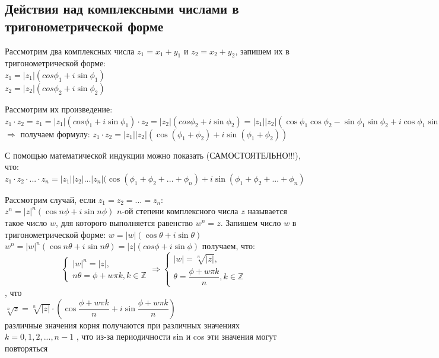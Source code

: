 \documentclass[oneside]{book}
\begin{document}
\begin{enumerate}
\begin{itemize}
\begin{enumerate}
\subsection{Действия над комплексными числами в тригонометрической форме}
\par Рассмотрим два комплексных числа $z_1=x_1+y_1$ и $z_2=x_2+y_2$, запишем их в тригонометрической форме:\\ $z_1=|z_1|(cos\phi_1+i\sin\phi_1)$\\
$z_2=|z_2|(cos\phi_2+i\sin\phi_2)$\\
\par Рассмотрим их произведение:\\ $z_1\cdot z_2=z_1=|z_1|(cos\phi_1+i\sin\phi_1)\cdot z_2=|z_2|(cos\phi_2+i\sin\phi_2)=|z_1||z_2|(\cos\phi_1\cos\phi_2-\sin\phi_1\sin\phi_2+i\cos\phi_1\sin\phi_2+i\cos\phi_2\sin\phi_1)=|z_1||z_2|(\cos(\phi_1+\phi_2)+i\sin(\phi_1+\phi_2))$
\\ $\Rightarrow$ получаем формулу: $z_1\cdot z_2=|z_1||z_2|(\cos(\phi_1+\phi_2)+i\sin(\phi_1+\phi_2))$\\
\par С помощью математической индукции можно показать (САМОСТОЯТЕЛЬНО!!!), что:\\ $z_1\cdot z_2\cdot...\cdot z_n=|z_1||z_2|...|z_n|(\cos(\phi_1+\phi_2+...+\phi_n)+i\sin(\phi_1+\phi_2+...+\phi_n)$ 
\par Рассмотрим случай, если $z_1=z_2=...=z_n$:\\
$z^n=|z|^n(\cos n\phi+i\sin n\phi)$
 $n$-ой степени комплексного числа $z$ называется такое число $w$, для которого выполняется равенство $w^n=z$. Запишем число $w$ в тригонометрической форме: $w=|w|(\cos\theta+i\sin\theta)$\\
$w^n=|w|^n(\cos n\theta+i\sin n\theta)=|z|(cos\phi+i\sin\phi)$
 получаем, что:
\begin{equation}
	\begin{cases}
		|w|^n=|z|,\\
		n\theta=\phi+w\pi k, k \in \mathbb{Z}
	\end{cases}
	\Rightarrow
	\begin{cases}
		|w|=\sqrt[n]{|z|},\\
		\theta=\dfrac{\phi+w\pi k}{n}, k \in \mathbb{Z}
	\end{cases}
\end{equation}
, что\\
$\sqrt[n]{z}=\sqrt[n]{|z|}\cdot (\cos\dfrac{\phi+w\pi k}{n}+i\sin\dfrac{\phi+w\pi k}{n})$\\
различные значения корня получаются при различных значениях $k=0, 1, 2, ..., n-1$
, что из-за периодичности sin и cos эти значения могут повторяться

\end{enumerate}
\end{itemize}
\end{enumerate}
\end{document}
